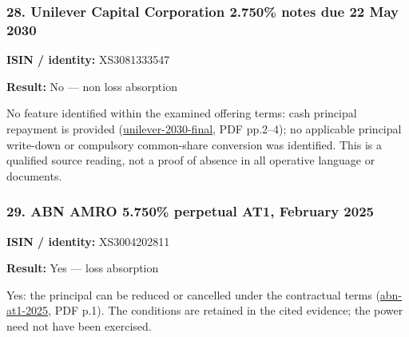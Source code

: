 \documentclass[
  11pt,
]{article}
\begin{document}
\begin{minipage}{\linewidth}

\hypertarget{unilever-capital-corporation-2.750-notes-due-22-may-2030}{%
\subsubsection{28. Unilever Capital Corporation 2.750\% notes due 22 May
2030}\label{unilever-capital-corporation-2.750-notes-due-22-may-2030}}

\textbf{ISIN / identity:} XS3081333547

\textbf{Result:} No --- non loss absorption

No feature identified within the examined offering terms: cash principal
repayment is provided
(\href{https://www.rns-pdf.londonstockexchange.com/rns/5821J_1-2025-5-21.pdf}{unilever-2030-final},
PDF pp.2--4); no applicable principal write-down or compulsory
common-share conversion was identified. This is a qualified source
reading, not a proof of absence in all operative language or documents.

\end{minipage}
\par\addvspace{1.1em}

\begin{minipage}{\linewidth}

\hypertarget{abn-amro-5.750-perpetual-at1-february-2025}{%
\subsubsection{29. ABN AMRO 5.750\% perpetual AT1, February
2025}\label{abn-amro-5.750-perpetual-at1-february-2025}}

\textbf{ISIN / identity:} XS3004202811

\textbf{Result:} Yes --- loss absorption

Yes: the principal can be reduced or cancelled under the contractual
terms
(\href{https://assets.ctfassets.net/1u811bvgvthc/6ZQ3Wu8Ft9B213eJuFEtWg/9b9df49434fffbc6407b418083b4a1e0/ABN_AMRO_AT1_XS3004202811_Offering_Circular_EUR_PNC2033_dd_26Feb2025.pdf}{abn-at1-2025},
PDF p.1). The conditions are retained in the cited evidence; the power
need not have been exercised.

\end{minipage}
\par\addvspace{1.1em}
\end{document}
